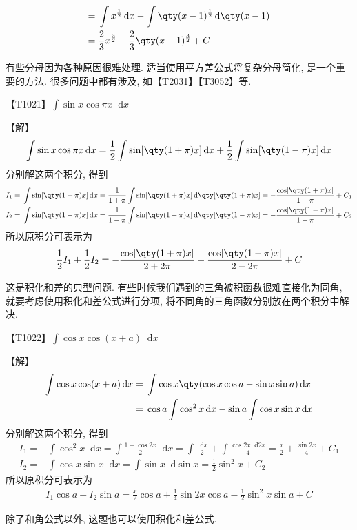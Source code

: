 \documentclass{ctexbook}
\newcommand*{\dif}{\mathop{}\!\mathrm{d}}
\begin{document}
{\begin{align*}
={}&\int x^{\frac{1}{2}}\dif{x}-\int \qty(x-1)^{\frac{1}{2}}\dif{\qty(x-1)}\\
={}&\frac{2}{3}x^{\frac{3}{2}}-\frac{2}{3}\qty(x-1)^{\frac{3}{2}}+C
\end{align*}\par
{\kaishu 有些分母因为各种原因很难处理. 适当使用平方差公式将复杂分母简化, 是一个重要的方法. 很多问题中都有涉及, 如{\color{red}【T2031】}{\color{red}【T3052】}等. \par}
【T1021】$\int\sin{x}\cos{\pi x}\dif{x}$\par
【解】\begin{align*}
\int\sin{x}\cos{\pi x}\dif{x}=\frac{1}{2}\int\sin[\qty(1+\pi)x]\dif{x}+\frac{1}{2}\int\sin[\qty(1-\pi)x]\dif{x}
\end{align*}
分别解这两个积分, 得到
\begin{align*}
I_{1}={}&\int\sin[\qty(1+\pi)x]\dif{x}=\frac{1}{1+\pi}\int\sin[\qty(1+\pi)x]\dif{\qty[\qty(1+\pi)x]}=-\frac{\cos[\qty(1+\pi)x]}{1+\pi}+C_{1}\\
I_{2}={}&\int\sin[\qty(1-\pi)x]\dif{x}=\frac{1}{1-\pi}\int\sin[\qty(1-\pi)x]\dif{\qty[\qty(1-\pi)x]}=-\frac{\cos[\qty(1-\pi)x]}{1-\pi}+C_{2}
\end{align*}
所以原积分可表示为
\begin{align*}
\frac{1}{2}I_{1}+\frac{1}{2}I_{2}=-\frac{\cos[\qty(1+\pi)x]}{2+2\pi}-\frac{\cos[\qty(1-\pi)x]}{2-2\pi}+C
\end{align*}\par
{\kaishu 这是积化和差的典型问题. 有些时候我们遇到的三角被积函数很难直接化为同角, 就要考虑使用积化和差公式进行分项, 将不同角的三角函数分别放在两个积分中解决. \par}
{\color{red}【T1022】}$\int\cos{x}\cos(x+a)\dif{x}$\par
【解】
\begin{align*}
\int\cos{x}\cos(x+a)\dif{x}={}&\int\cos{x}\qty(\cos{x}\cos{a}-\sin{x}\sin{a})\dif{x}\\
={}&\cos{a}\int\cos^{2}{x}\dif{x}-\sin{a}\int\cos{x}\sin{x}\dif{x}
\end{align*}
分别解这两个积分, 得到
\begin{align*}
I_{1}={}&\int\cos^{2}{x}\dif{x}=\int\frac{1+\cos{2x}}{2}\dif{x}=\int\frac{\dif{x}}{2}+\int\frac{\cos{2x}\dif{2x}}{4}=\frac{x}{2}+\frac{\sin{2x}}{4}+C_{1}\\
I_{2}={}&\int\cos{x}\sin{x}\dif{x}=\int\sin{x}\dif{\sin{x}}=\frac{1}{2}\sin^{2}{x}+C_{2}
\end{align*}
所以原积分可表示为
\begin{align*}
I_{1}\cos{a}-I_{2}\sin{a}=\frac{x}{2}\cos{a}+\frac{1}{4}\sin{2x}\cos{a}-\frac{1}{2}\sin^{2}{x}\sin{a}+C
\end{align*}\par
{\kaishu 除了和角公式以外, 这题也可以使用积化和差公式. \par}
}
\end{document}
